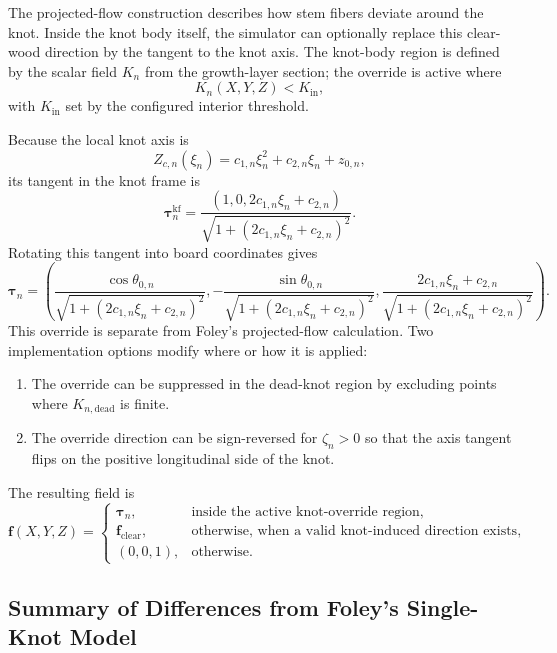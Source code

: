 \documentclass[11pt]{article}
\begin{document}
The projected-flow construction describes how stem fibers deviate around the knot. Inside the knot body itself,
the simulator can optionally replace this clear-wood direction by the tangent to the knot axis. The knot-body
region is defined by the scalar field $K_n$ from the growth-layer section; the override is active where
\begin{equation}
K_n(X,Y,Z)<K_{\mathrm{in}},
\end{equation}
with $K_{\mathrm{in}}$ set by the configured interior threshold.

Because the local knot axis is
\[
Z_{c,n}(\xi_n)=c_{1,n}\xi_n^2+c_{2,n}\xi_n+z_{0,n},
\]
its tangent in the knot frame is
\begin{equation}
\bm{\tau}^{\mathrm{kf}}_n
=
\frac{(1,0,2c_{1,n}\xi_n+c_{2,n})}
{\sqrt{1+(2c_{1,n}\xi_n+c_{2,n})^2}}.
\end{equation}
Rotating this tangent into board coordinates gives
\begin{equation}
\bm{\tau}_n
=
\left(
\frac{\cos\theta_{0,n}}{\sqrt{1+(2c_{1,n}\xi_n+c_{2,n})^2}},
-\frac{\sin\theta_{0,n}}{\sqrt{1+(2c_{1,n}\xi_n+c_{2,n})^2}},
\frac{2c_{1,n}\xi_n+c_{2,n}}{\sqrt{1+(2c_{1,n}\xi_n+c_{2,n})^2}}
\right).
\end{equation}
This override is separate from Foley's projected-flow calculation. Two implementation options modify where or
how it is applied:
\begin{enumerate}
\item The override can be suppressed in the dead-knot region by excluding points where $K_{n,\mathrm{dead}}$ is
finite.
\item The override direction can be sign-reversed for $\zeta_n>0$ so that the axis tangent flips on the
positive longitudinal side of the knot.
\end{enumerate}

The resulting field is
\begin{equation}
\bm{f}(X,Y,Z)
=
\begin{cases}
\bm{\tau}_n, & \text{inside the active knot-override region},\\[4pt]
\bm{f}_{\mathrm{clear}}, & \text{otherwise, when a valid knot-induced direction exists},\\[4pt]
(0,0,1), & \text{otherwise}.
\end{cases}
\end{equation}

\subsection{Summary of Differences from Foley's Single-Knot Model}
\end{document}
